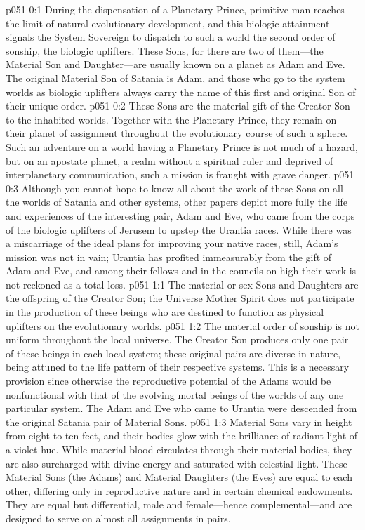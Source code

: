 \author{Secondary Lanonandek}
\vs p051 0:1 During the dispensation of a Planetary Prince, primitive man reaches the limit of natural evolutionary development, and this biologic attainment signals the System Sovereign to dispatch to such a world the second order of sonship, the biologic uplifters. These Sons, for there are two of them---the Material Son and Daughter---are usually known on a planet as Adam and Eve. The original Material Son of Satania is Adam, and those who go to the system worlds as biologic uplifters always carry the name of this first and original Son of their unique order.
\vs p051 0:2 These Sons are the material gift of the Creator Son to the inhabited worlds. Together with the Planetary Prince, they remain on their planet of assignment throughout the evolutionary course of such a sphere. Such an adventure on a world having a Planetary Prince is not much of a hazard, but on an apostate planet, a realm without a spiritual ruler and deprived of interplanetary communication, such a mission is fraught with grave danger.
\vs p051 0:3 Although you cannot hope to know all about the work of these Sons on all the worlds of Satania and other systems, other papers depict more fully the life and experiences of the interesting pair, Adam and Eve, who came from the corps of the biologic uplifters of Jerusem to upstep the Urantia races. While there was a miscarriage of the ideal plans for improving your native races, still, Adam’s mission was not in vain; Urantia has profited immeasurably from the gift of Adam and Eve, and among their fellows and in the councils on high their work is not reckoned as a total loss.
\vs p051 1:1 The material or sex Sons and Daughters are the offspring of the Creator Son; the Universe Mother Spirit does not participate in the production of these beings who are destined to function as physical uplifters on the evolutionary worlds.
\vs p051 1:2 The material order of sonship is not uniform throughout the local universe. The Creator Son produces only one pair of these beings in each local system; these original pairs are diverse in nature, being attuned to the life pattern of their respective systems. This is a necessary provision since otherwise the reproductive potential of the Adams would be nonfunctional with that of the evolving mortal beings of the worlds of any one particular system. The Adam and Eve who came to Urantia were descended from the original Satania pair of Material Sons.
\pc \vs p051 1:3 Material Sons vary in height from eight to ten feet, and their bodies glow with the brilliance of radiant light of a violet hue. While material blood circulates through their material bodies, they are also surcharged with divine energy and saturated with celestial light. These Material Sons (the Adams) and Material Daughters (the Eves) are equal to each other, differing only in reproductive nature and in certain chemical endowments. They are equal but differential, male and female---hence complemental---and are designed to serve on almost all assignments in pairs.
